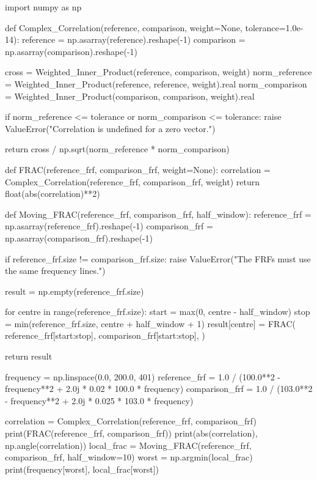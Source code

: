 \begin{python}
import numpy as np


def Complex_Correlation(reference, comparison, weight=None,
                        tolerance=1.0e-14):
    reference = np.asarray(reference).reshape(-1)
    comparison = np.asarray(comparison).reshape(-1)

    cross = Weighted_Inner_Product(reference, comparison, weight)
    norm_reference = Weighted_Inner_Product(reference, reference, weight).real
    norm_comparison = Weighted_Inner_Product(comparison, comparison, weight).real

    if norm_reference <= tolerance or norm_comparison <= tolerance:
        raise ValueError("Correlation is undefined for a zero vector.")

    return cross / np.sqrt(norm_reference * norm_comparison)


def FRAC(reference_frf, comparison_frf, weight=None):
    correlation = Complex_Correlation(reference_frf, comparison_frf, weight)
    return float(abs(correlation)**2)


def Moving_FRAC(reference_frf, comparison_frf, half_window):
    reference_frf = np.asarray(reference_frf).reshape(-1)
    comparison_frf = np.asarray(comparison_frf).reshape(-1)

    if reference_frf.size != comparison_frf.size:
        raise ValueError("The FRFs must use the same frequency lines.")

    result = np.empty(reference_frf.size)

    for centre in range(reference_frf.size):
        start = max(0, centre - half_window)
        stop = min(reference_frf.size, centre + half_window + 1)
        result[centre] = FRAC(
            reference_frf[start:stop],
            comparison_frf[start:stop],
        )

    return result


frequency = np.linspace(0.0, 200.0, 401)
reference_frf = 1.0 / (100.0**2 - frequency**2 + 2.0j * 0.02 * 100.0 * frequency)
comparison_frf = 1.0 / (103.0**2 - frequency**2 + 2.0j * 0.025 * 103.0 * frequency)

correlation = Complex_Correlation(reference_frf, comparison_frf)
print(FRAC(reference_frf, comparison_frf))
print(abs(correlation), np.angle(correlation))
local_frac = Moving_FRAC(reference_frf, comparison_frf, half_window=10)
worst = np.argmin(local_frac)
print(frequency[worst], local_frac[worst])
\end{python}


